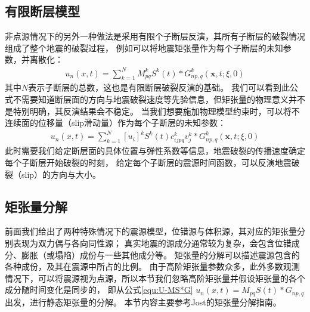 \subsection{有限断层模型}
非点源情况下的另外一种做法是采用有限个子断层反演，其所有子断层的破裂情况组成了整个地震的破裂过程，
例如可以将地震矩张量作为每个子断层的未知参数，并离散化：
\begin{align}
    u_n(x,t) = \sum_{k=1}^N M_{pq}^k S^k(t)*G_{np,q}^k(\mathbf{x}, t; \xi, 0) 
    \label{equ:multi-M}
\end{align}
其中$N$表示子断层的总数，这也是有限断层破裂反演的基础。
我们可以看到此公式不需要知道断层面的方向与地震破裂速度等先验信息，但矩张量的物理意义并不是特别明确，其反演结果会不稳定。
当我们想要施加物理模型约束时，可以将不连续面的位移量（slip滑动量）作为每个子断层的未知参数：
\begin{align}
    u_n(x,t) = \sum_{k=1}^N [u_i]^k S^k(t) c_{ijpq}^k v_j^k * G_{np,q}^k(\mathbf{x}, t; \xi, 0) 
    \label{equ:multi-slip}
\end{align}
此时需要我们给定断层面的具体位置与弹性系数等信息，地震破裂的传播速度确定每个子断层开始破裂的时刻，
给定每个子断层的震源时间函数，可以反演地震破裂（slip）的方向与大小。






\subsection{矩张量分解}

前面我们给出了两种特殊情况下的震源模型，位错源与体积源，其对应的矩张量分别表现为双力偶与各向同性源；
真实地震的源成分通常较为复杂，会包含位错成分、膨胀（或塌陷）成份与一些其他成分等。
矩张量的分解可以描述震源包含的各种成份，及其在震源中所占的比例。
由于高阶矩张量参数众多，此外多数观测情况下，可以将震源视为点源，所以本节我们忽略高阶矩张量并假设矩张量的各个成分随时间变化是同步的，
即从公式\ref{equ:U-MS*G} $u_n(x,t)=M_{pq}S(t)*G_{np,q}$出发，进行静态矩张量的分解。
本节内容主要参考Jost的矩张量分解指南\citep{jost1989student}。

